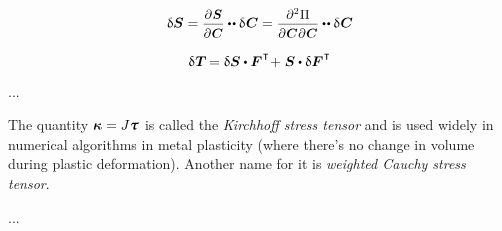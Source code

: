 \begin{otherlanguage}{russian}
\begin{equation*}
\variation{\secondpiolakirchhoffstress}
= \scalebox{0.92}{$ \displaystyle \frac{\partial \hspace{.1ex} \bm{S}}{\raisemath{-0.1em}{\partial \hspace{.1ex} \bm{C}}} $} \dotdotp \variation{\hspace{.12ex}\bm{C}}
= \scalebox{0.92}{$ \displaystyle \frac{\partial^2 \hspace{0.1ex} \Pi}{\raisemath{-0.1em}{\partial \hspace{0.1ex} \bm{C} \hspace{0.1ex} \partial \hspace{0.1ex} \bm{C}}} $} \dotdotp \variation{\hspace{.12ex}\bm{C}} 
\end{equation*}

\begin{equation*}
\variation{\hspace{.1ex}\firstpiolakirchhoffstress} \hspace{-0.2ex} =
\variation{\secondpiolakirchhoffstress} \dotp \bm{F}^{\hspace{.1ex}\T} \hspace{-0.4ex} + \hspace{.1ex}
\secondpiolakirchhoffstress \dotp \variation{\bm{F}}^{\hspace{.1ex}\T}
\end{equation*}

...

{\small
The quantity ${\bm{\kappa} = J \cauchystress}$ is called the \emph{Kirchhoff stress tensor} and is used widely in numerical algorithms in metal plasticity (where there’s no change in volume during plastic deformation). Another name for it is \emph{weighted Cauchy stress tensor}.
\par}

...

\end{otherlanguage}




